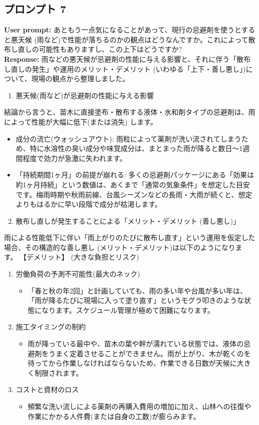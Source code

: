 \documentclass[a4paper, 11pt]{jsarticle}
\begin{document}
\subsection{プロンプト 7}
\noindent\textbf{User prompt:} あともう一点気になることがあって、現行の忌避剤を使うとすると悪天候 (雨など)で性能が落ちるのかの観点はどうなんですか。これによって散布し直しの可能性もありますし、この上下はどうですか? \\
\noindent\textbf{Response:} 雨などの悪天候が忌避剤の性能に与える影響と、それに伴う「散布し直しの発生」や運用のメリット・デメリット (いわゆる「上下・善し悪し」)について、現場の観点から整理しました。
\begin{enumerate}
    \item 悪天候(雨など)が忌避剤の性能に与える影響
\end{enumerate}
結論から言うと、苗木に直接塗布・散布する液体・水和剤タイプの忌避剤は、雨によって性能が大幅に低下(または消失) します。
\begin{itemize}
    \item 成分の流亡(ウォッシュアウト): 雨粒によって薬剤が洗い流されてしまうため、特に水溶性の臭い成分や味覚成分は、まとまった雨が降ると数日〜1週間程度で効力が急激に失われます。
    \item 「持続期間1ヶ月」の前提が崩れる: 多くの忌避剤パッケージにある「効果は約1ヶ月持続」という数値は、あくまで「通常の気象条件」を想定した目安です。梅雨時期や秋雨前線、台風シーズンなどの長雨・大雨が続くと、想定よりもはるかに早い段階で成分が枯渇します。
\end{itemize}
\begin{enumerate}
    \setcounter{enumi}{1}
    \item 散布し直しが発生することによる「メリット・デメリット (善し悪し)」
\end{enumerate}
雨による性能低下に伴い「雨上がりのたびに散布し直す」という運用を仮定した場合、その構造的な善し悪し (メリット・デメリット)は以下のようになります。
【デメリット】 (大きな負担とリスク)
\begin{enumerate}
    \item 労働負荷の予測不可能性(最大のネック)
    \begin{itemize}
        \item[○] 「春と秋の年2回」と計画していても、雨の多い年や台風が多い年は、「雨が降るたびに現場に入って塗り直す」というモグラ叩きのような状態になります。スケジュール管理が極めて困難になります。
    \end{itemize}
    \item 施工タイミングの制約
    \begin{itemize}
        \item[○] 雨が降っている最中や、苗木の葉や幹が濡れている状態では、液体の忌避剤をうまく定着させることができません。雨が上がり、木が乾くのを待ってから作業しなければならないため、作業できる日数が天候に大きく制限されます。
    \end{itemize}
    \item コストと資材のロス
    \begin{itemize}
        \item[○] 頻繁な洗い流しによる薬剤の再購入費用の増加に加え、山林への往復や作業にかかる人件費(または自身の工数)が膨らみます。
    \end{itemize}
\end{enumerate}
\end{document}
